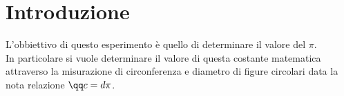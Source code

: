 \section*{Introduzione}

L'obbiettivo di questo esperimento è quello di determinare il valore del $\pi$.\\
In particolare si vuole determinare il valore di questa costante matematica attraverso la misurazione 
di circonferenza e diametro di figure circolari data la nota relazione $\qq c = d\pi$.\\
